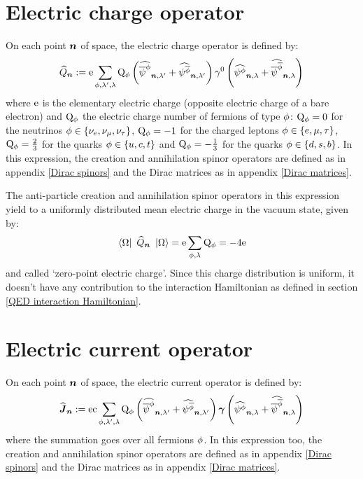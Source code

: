 \documentclass[10pt,a4paper,twoside,openany]{book}
\begin{document}
\section{Electric charge operator}
\label{Electric charge operator}

On each point $\boldsymbol{n}$ of space, the electric charge operator is defined by:
\begin{equation*}
\widehat{Q}_{\boldsymbol{n}} := \mathrm e \sum_{\phi,\lambda',\lambda} \mathrm Q_{\phi} \left( \widehat{\overline \psi^{\phi}}_{{\boldsymbol{n}}, {\lambda'}} + \widehat{\psi^{\overline{\phi}}}_{{\boldsymbol{n}}, {\lambda'}} \right) \gamma^{0} \left( \widehat{\psi^{\phi}}_{{\boldsymbol{n}}, {\lambda}} + \widehat{\overline \psi^{\overline{\phi}}}_{{\boldsymbol{n}}, {\lambda}} \right)
\end{equation*}
where $\mathrm e$ is the elementary electric charge (opposite electric charge of a bare electron) and $\mathrm Q_{\phi}$ the electric charge number of fermions of type $\phi$: $\mathrm Q_{\phi} = 0$ for the neutrinos $\phi \in \{ \nu_{e}, \nu_{\mu}, \nu_{\tau} \}$, $\mathrm Q_{\phi} = -1$ for the charged leptons $\phi \in \{ e, \mu, \tau \}$, $\mathrm Q_{\phi} = \frac 2 3$ for the quarks $\phi \in \{ u, c, t \}$ and $\mathrm Q_{\phi} = - \frac 1 3$ for the quarks $\phi \in \{ d, s, b \}$. In this expression, the creation and annihilation spinor operators are defined as in appendix \ref{Dirac spinors} and the Dirac matrices as in appendix \ref{Dirac matrices}.

The anti-particle creation and annihilation spinor operators in this expression yield to a uniformly distributed mean electric charge in the vacuum state, given by:
\begin{equation*}
\left\langle{\Omega}\right|\  \widehat{Q}_{\boldsymbol{n}} \ \left|{\Omega}\right\rangle = \mathrm e \sum_{\phi,\lambda} \mathrm Q_{\phi} = - 4 \mathrm e
\end{equation*}
and called `zero-point electric charge'. Since this charge distribution is uniform, it doesn't have any contribution to the interaction Hamiltonian as defined in section \ref{QED interaction Hamiltonian}.

\section{Electric current operator}

On each point $\boldsymbol{n}$ of space, the electric current operator is defined by:
\begin{equation*}
\widehat{\boldsymbol{J}}_{\boldsymbol{n}} := \mathrm e \mathrm c \sum_{\phi,\lambda',\lambda} \mathrm Q_{\phi} \left( \widehat{\overline \psi^{\phi}}_{{\boldsymbol{n}}, {\lambda'}} + \widehat{\psi^{\overline{\phi}}}_{{\boldsymbol{n}}, {\lambda'}} \right) \boldsymbol{\gamma} \left( \widehat{\psi^{\phi}}_{{\boldsymbol{n}}, {\lambda}} + \widehat{\overline \psi^{\overline{\phi}}}_{{\boldsymbol{n}}, {\lambda}} \right)
\end{equation*}
where the summation goes over all fermions $\phi$. In this expression too, the creation and annihilation spinor operators are defined as in appendix \ref{Dirac spinors} and the Dirac matrices as in appendix \ref{Dirac matrices}.
\end{document}
